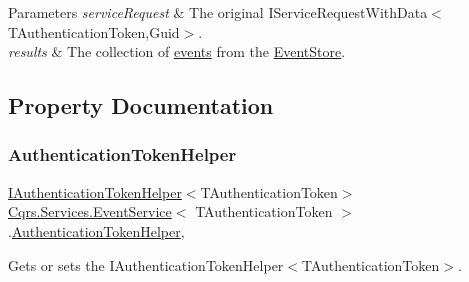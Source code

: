 \begin{DoxyParams}{Parameters}
{\em service\+Request} & The original I\+Service\+Request\+With\+Data$<$\+T\+Authentication\+Token,\+Guid$>$.\\
\hline
{\em results} & The collection of \hyperlink{}{events} from the \hyperlink{namespaceCqrs_1_1EventStore}{Event\+Store}.\\
\hline
\end{DoxyParams}


\subsection{Property Documentation}
\mbox{\label{classCqrs_1_1Services_1_1EventService_a7da2e2ec8d77d5972cea45a7ad482f39_a7da2e2ec8d77d5972cea45a7ad482f39}} 
\subsubsection{\texorpdfstring{Authentication\+Token\+Helper}{AuthenticationTokenHelper}}
{\footnotesize\ttfamily \hyperlink{interfaceCqrs_1_1Authentication_1_1IAuthenticationTokenHelper}{I\+Authentication\+Token\+Helper}$<$T\+Authentication\+Token$>$ \hyperlink{classCqrs_1_1Services_1_1EventService}{Cqrs.\+Services.\+Event\+Service}$<$ T\+Authentication\+Token $>$.\hyperlink{classCqrs_1_1Authentication_1_1AuthenticationTokenHelper}{Authentication\+Token\+Helper}\hspace{0.3cm}{\ttfamily [get]}, {\ttfamily [protected]}}



Gets or sets the I\+Authentication\+Token\+Helper$<$\+T\+Authentication\+Token$>$. 

\mbox{\label{classCqrs_1_1Services_1_1EventService_a1c12d11de253a85f7257c412bca1532b_a1c12d11de253a85f7257c412bca1532b}} 
